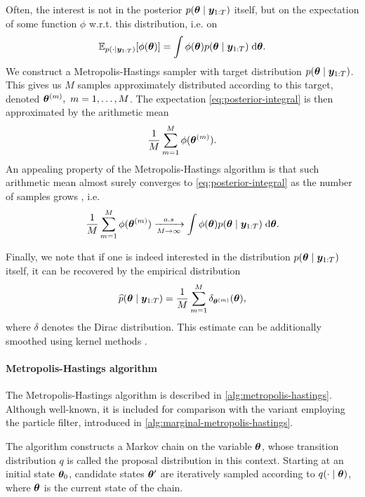 Often, the interest is not in the posterior $p(\bm{\theta} \mid \bm{y}_{1:T})$ itself, but on the expectation of some function $\phi$ w.r.t. this distribution, i.e. on
\begin{equation} \label{eq:posterior-integral}
\mathbb{E}_{p(\cdot \mid \bm{y}_{1:T})}[\phi(\bm{\theta})] = \int \phi(\bm{\theta}) p(\bm{\theta} \mid \bm{y}_{1:T}) \; \mathrm{d}{\bm{\theta}}.
\end{equation}
We construct a Metropolis-Hastings sampler \citep{metropolis, hastings} with target distribution $p(\bm{\theta} \mid \bm{y}_{1:T})$. This gives us $M$ samples approximately distributed according to this target, denoted $\bm{\theta}^{(m)},\ m = 1, \ldots, M$. The expectation \eqref{eq:posterior-integral} is then approximated by the arithmetic mean
\begin{equation*}
\frac{1}{M} \sum_{m=1}^M \phi(\bm{\theta}^{(m)}).
\end{equation*}
An appealing property of the Metropolis-Hastings algorithm is that such arithmetic mean almost surely converges to \eqref{eq:posterior-integral} as the number of samples grows \citep{robert-casella}, i.e.
\begin{equation*}
\frac{1}{M} \sum_{m=1}^M \phi(\bm{\theta}^{(m)}) \xrightarrow[M \to \infty]{a.s} \int \phi(\bm{\theta}) p(\bm{\theta} \mid \bm{y}_{1:T}) \; \mathrm{d}{\bm{\theta}}.
\end{equation*}

Finally, we note that if one is indeed interested in the distribution $p(\bm{\theta} \mid \bm{y}_{1:T})$ itself, it can be recovered by the empirical distribution
\begin{equation*}
\widehat{p}(\bm{\theta} \mid \bm{y}_{1:T}) = \frac{1}{M} \sum_{m=1}^M \delta_{\bm{\theta}^{(m)}}(\bm{\theta}),
\end{equation*}
where $\delta$ denotes the Dirac distribution. This estimate can be additionally smoothed using kernel methods \citep{kernel-smoothing}.


\paragraph{Metropolis-Hastings algorithm}
The Metropolis-Hastings algorithm is described in \autoref{alg:metropolis-hastings}. Although well-known, it is included for comparison with the variant employing the particle filter, introduced in \autoref{alg:marginal-metropolis-hastings}.

The algorithm constructs a Markov chain on the variable $\bm{\theta}$, whose transition distribution $q$ is called the proposal distribution in this context. Starting at an initial state $\bm{\theta}_0$, candidate states $\bm{\theta}^\prime$ are iteratively sampled according to $q(\cdot \mid \bm{\theta})$, where $\bm{\theta}$ is the current state of the chain.

